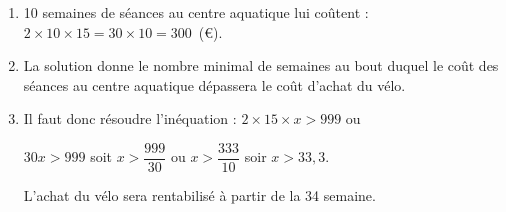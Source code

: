 
\medskip

%
%
%

\begin{enumerate}
\item %
10 semaines de séances au centre aquatique lui coûtent : $2 \times 10 \times 15 = 30 \times 10 = 300$~(\euro).
\item %

%
La solution donne le nombre minimal de semaines au bout duquel le coût des séances au centre aquatique dépassera le coût d'achat du vélo.
\item %
Il faut donc résoudre l'inéquation : $2\times 15 \times x > 999$ ou

$30x > 999$ soit $x > \dfrac{999}{30}$ ou $x > \dfrac{333}{10}$ soir $x> 33,3$.

L'achat du vélo sera rentabilisé à partir de la 34 semaine.
\end{enumerate}

\bigskip

